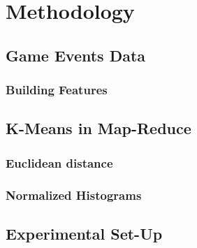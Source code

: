 
\chapter{Methodology} %
\label{Chapter4}


\section{Game Events Data}
\subsection{Building Features}
\section{K-Means in Map-Reduce}
\subsection{Euclidean distance}
\subsection{Normalized Histograms}
\section{Experimental Set-Up}